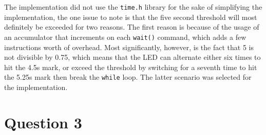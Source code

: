 \documentclass{article}
\begin{document}
The implementation did not use the \texttt{time.h} library for the sake of simplifying the implementation, the one issue to note is that the five second threshold will most definitely be exceeded for two reasons. The first reason is because of the usage of an accumulator that increments on each \texttt{wait()} command, which adds a few instructions worth of overhead. Most significantly, however, is the fact that 5 is not divisible by 0.75, which means that the LED can alternate either six times to hit the 4.5s mark, or exceed the threshold by switching for a seventh time to hit the 5.25s mark then break the \texttt{while} loop. The latter scenario was selected for the implementation.\pagebreak


\section*{Question 3}
\end{document}
